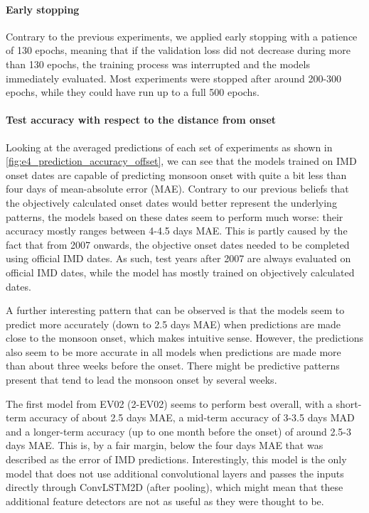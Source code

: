 \paragraph{Early stopping}
Contrary to the previous experiments, we applied early stopping with a patience of 130 epochs, meaning that if the validation loss did not decrease during more than 130 epochs, the training process was interrupted and the models immediately evaluated. Most experiments were stopped after around 200-300 epochs, while they could have run up to a full 500 epochs.

\paragraph{Test accuracy with respect to the distance from onset}
Looking at the averaged predictions of each set of experiments as shown in \cref{fig:e4_prediction_accuracy_offset}, we can see that the models trained on IMD onset dates are capable of predicting monsoon onset with quite a bit less than four days of mean-absolute error (MAE). Contrary to our previous beliefs that the objectively calculated onset dates would better represent the underlying patterns, the models based on these dates seem to perform much worse: their accuracy mostly ranges between 4-4.5 days MAE. This is partly caused by the fact that from 2007 onwards, the objective onset dates needed to be completed using official IMD dates. As such, test years after 2007 are always evaluated on official IMD dates, while the model has mostly trained on objectively calculated dates.

A further interesting pattern that can be observed is that the models seem to predict more accurately (down to 2.5 days MAE) when predictions are made close to the monsoon onset, which makes intuitive sense. However, the predictions also seem to be more accurate in all models when predictions are made more than about three weeks before the onset. There might be predictive patterns present that tend to lead the monsoon onset by several weeks.

The first model from EV02 (2-EV02) seems to perform best overall, with a short-term accuracy of about 2.5 days MAE, a mid-term accuracy of 3-3.5 days MAD and a longer-term accuracy (up to one month before the onset) of around 2.5-3 days MAE. This is, by a fair margin, below the four days MAE that was described as the error of IMD predictions. Interestingly, this model is the only model that does not use additional convolutional layers and passes the inputs directly through ConvLSTM2D (after pooling), which might mean that these additional feature detectors are not as useful as they were thought to be.

